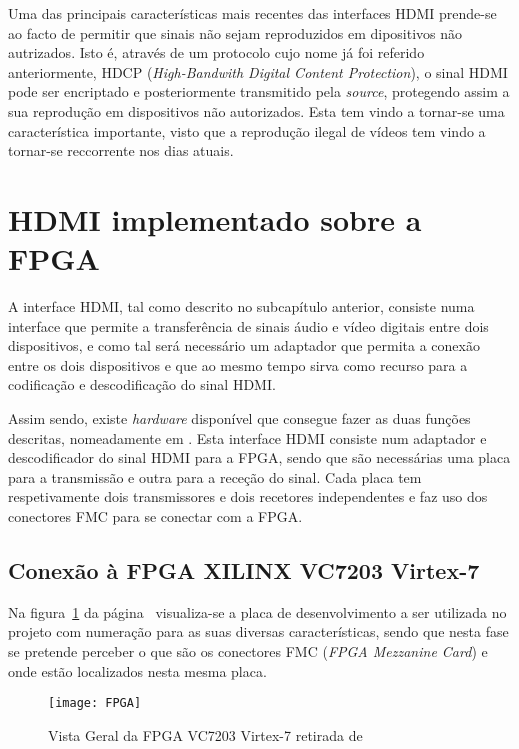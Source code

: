 Uma das principais características mais recentes das interfaces HDMI prende-se ao facto de permitir que sinais não sejam reproduzidos em dipositivos não autrizados. Isto é, através de um protocolo cujo nome já foi referido anteriormente, HDCP (\textit{High-Bandwith Digital Content Protection}), o sinal HDMI pode ser encriptado e posteriormente transmitido pela \textit{source}, protegendo assim a sua reprodução em dispositivos não autorizados. Esta tem vindo a tornar-se uma característica importante, visto que a reprodução ilegal de vídeos tem vindo a tornar-se reccorrente nos dias atuais.

\section{HDMI implementado sobre a FPGA}\label{sec:HDMIinFPGA}
A interface HDMI, tal como descrito no subcapítulo anterior, consiste numa interface que permite a transferência de sinais áudio e vídeo digitais entre dois dispositivos, e como tal será necessário um adaptador que permita a conexão entre os dois dispositivos e que ao mesmo tempo sirva como recurso para a codificação e descodificação do sinal HDMI. 

Assim sendo, existe \textit{hardware} disponível que consegue fazer as duas funções descritas, nomeadamente em \cite{R009}. Esta interface HDMI consiste num adaptador e descodificador do sinal HDMI para a FPGA, sendo que são necessárias uma placa para a transmissão e outra para a receção do sinal. Cada placa tem respetivamente dois transmissores e dois recetores independentes e faz uso dos conectores FMC para se conectar com a FPGA.

\subsection{Conexão à FPGA XILINX VC7203 Virtex-7} \label{subsec:HDMIconexao} 
Na figura~\ref{fig:fpgaVistaGeral} da página~\pageref{fig:fpgaVistaGeral}  visualiza-se a placa de desenvolvimento a ser utilizada no projeto com numeração para as suas diversas características, sendo que nesta fase se pretende perceber o que são os conectores FMC (\textit{FPGA Mezzanine Card}) e onde estão localizados nesta mesma placa.

\begin{figure}[h!]
	\begin{center}
		\leavevmode
		\texttt{[image: FPGA]}
		\caption{Vista Geral da FPGA VC7203 Virtex-7 retirada de \cite{R008}}
		\label{fig:fpgaVistaGeral}
	\end{center}
\end{figure}

